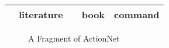 \begin{table}[th]
\begin{tabular}{|c|l|l|l|l|}
      &  literature &       & book & command	\\
      \hline
\end{tabular}%
\end{table}



\begin{figure}[th]
\centering
{}
\caption{A Fragment of ActionNet}
\label{fig:ac_taxonomy}
\end{figure}

